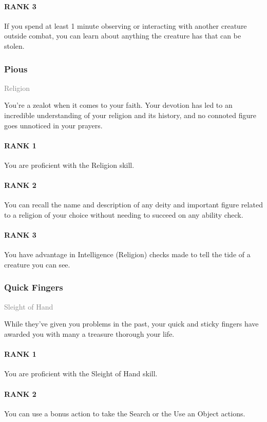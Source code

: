 \paragraph{RANK 3} If you spend at least 1 minute observing or interacting with another creature outside combat, you can learn about anything the creature has that can be stolen.

\subsubsection{Pious} \label{feat::pious}
\small{\textcolor{gray}{Religion}}

\normalsize
You're a zealot when it comes to your faith.
Your devotion has led to an incredible understanding of your religion and its history, and no connoted figure goes unnoticed in your prayers.
\paragraph{RANK 1} You are proficient with the Religion skill.
\paragraph{RANK 2} You can recall the name and description of any deity and important figure related to a religion of your choice without needing to succeed on any ability check.
\paragraph{RANK 3} You have advantage in Intelligence (Religion) checks made to tell the tide of a creature you can see.

\subsubsection{Quick Fingers} \label{feat::quickfingers}
\small{\textcolor{gray}{Sleight of Hand}}

\normalsize
While they've given you problems in the past, your quick and sticky fingers have awarded you with many a treasure thorough your life.
\paragraph{RANK 1} You are proficient with the Sleight of Hand skill.
\paragraph{RANK 2} You can use a bonus action to take the Search or the Use an Object actions.

